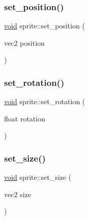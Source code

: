 \mbox{\label{classsprite_ac273d4def330f6280e88eeab65d60b32}} 
\subsubsection{\texorpdfstring{set\+\_\+position()}{set\_position()}}
{\footnotesize\ttfamily \hyperlink{imgui__impl__opengl3__loader_8h_ac668e7cffd9e2e9cfee428b9b2f34fa7}{void} sprite\+::set\+\_\+position (\begin{DoxyParamCaption}\item[{vec2}]{position }\end{DoxyParamCaption})\hspace{0.3cm}{\ttfamily [inline]}}

\mbox{\label{classsprite_ab95aac27f21039f0f8584343687e734b}} 
\subsubsection{\texorpdfstring{set\+\_\+rotation()}{set\_rotation()}}
{\footnotesize\ttfamily \hyperlink{imgui__impl__opengl3__loader_8h_ac668e7cffd9e2e9cfee428b9b2f34fa7}{void} sprite\+::set\+\_\+rotation (\begin{DoxyParamCaption}\item[{float}]{rotation }\end{DoxyParamCaption})\hspace{0.3cm}{\ttfamily [inline]}}

\mbox{\label{classsprite_a42ea6b6f3f0bb27ae75d136e118fdf06}} 
\subsubsection{\texorpdfstring{set\+\_\+size()}{set\_size()}}
{\footnotesize\ttfamily \hyperlink{imgui__impl__opengl3__loader_8h_ac668e7cffd9e2e9cfee428b9b2f34fa7}{void} sprite\+::set\+\_\+size (\begin{DoxyParamCaption}\item[{vec2}]{size }\end{DoxyParamCaption})\hspace{0.3cm}{\ttfamily [inline]}}

